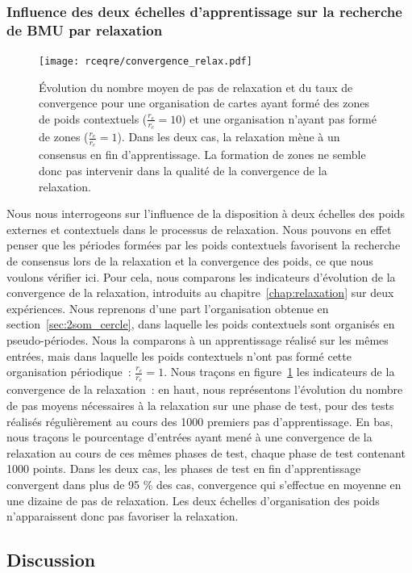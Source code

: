\documentclass[../main]{subfiles}
\begin{document}
\subsubsection{Influence des deux échelles d'apprentissage sur la recherche de BMU par relaxation}
\begin{figure}
	\centering\texttt{[image: rceqre/convergence\_relax.pdf]}
	\caption{\'Evolution du nombre moyen de pas de relaxation et du taux de convergence pour une organisation de cartes ayant formé des zones de poids contextuels ($\frac{r_e}{r_c} = 10$) et une organisation n'ayant pas formé de zones ($\frac{r_e}{r_c} = 1$). Dans les deux cas, la relaxation mène à un consensus en fin d'apprentissage. La formation de zones ne semble donc pas intervenir dans la qualité de la convergence de la relaxation. \label{fig:conv_rcre}}
\end{figure}

Nous nous interrogeons sur l'influence de la disposition à deux échelles des poids externes et contextuels dans le processus de relaxation.
Nous pouvons en effet penser que les périodes formées par les poids contextuels favorisent la recherche de consensus lors de la relaxation et la convergence des poids, ce que nous voulons vérifier ici.
Pour cela, nous comparons les indicateurs d'évolution de la convergence de la relaxation, introduits au chapitre~\ref{chap:relaxation} sur deux expériences.
Nous reprenons d'une part l'organisation obtenue en section~\ref{sec:2som_cercle}, dans laquelle les poids contextuels sont organisés en pseudo-périodes. Nous la comparons à un apprentissage réalisé sur les mêmes entrées, mais dans laquelle les poids contextuels n'ont pas formé cette organisation périodique~: $\frac{r_e}{r_c} = 1$. 
Nous traçons en figure~\ref{fig:conv_rcre} les indicateurs de la convergence de la relaxation~: en haut, nous représentons l'évolution du nombre de pas moyens nécessaires à la relaxation sur une phase de test, pour des tests réalisés régulièrement au cours des 1000 premiers pas d'apprentissage.
En bas, nous traçons le pourcentage d'entrées ayant mené à une convergence de la relaxation au cours de ces mêmes phases de test, chaque phase de test contenant 1000 points.
Dans les deux cas, les phases de test en fin d'apprentissage convergent dans plus de 95 \% des cas, convergence qui s'effectue en moyenne en une dizaine de pas de relaxation. Les deux échelles d'organisation des poids n'apparaissent donc pas favoriser la relaxation.



\subsection{Discussion}
\end{document}
